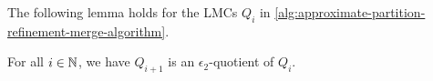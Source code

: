 %	
%	
%	

The following lemma holds for the LMCs $Q_i$ in \cref{alg:approximate-partition-refinement-merge-algorithm}.
\begin{lemma}\label{lemma:small-global-distance-loop-approximate-partition-refinement}
	For all $i \in \mathbb{N}$, we have $Q_{i+1}$ is an $\epsilon_2$-quotient of $Q_{i}$.
\end{lemma}

